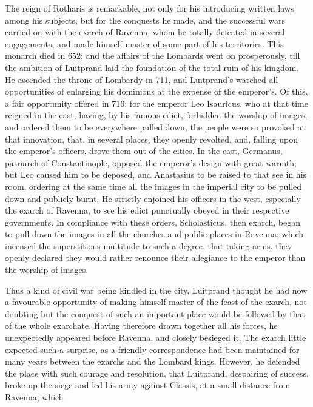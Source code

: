 \documentclass{article}
\begin{document}
The reign of Rotharis is remarkable, not only for his introducing written laws among his subjects, but for the conquests he made, and the successful wars carried on with the exarch of Ravenna, whom he totally defeated in several engagements, and made himself master of some part of his territories. This monarch died in 652; and the affairs of the Lombards went on prosperously, till the ambition of Luitprand laid the foundation of the total ruin of his kingdom. He ascended the throne of Lombardy in 711, and Luitprand's watched all opportunities of enlarging his dominions at the expense of the emperor's. Of this, a fair opportunity offered in 716: for the emperor Leo Isauricus, who at that time reigned in the east, having, by his famous edict, forbidden the worship of images, and ordered them to be everywhere pulled down, the people were so provoked at that innovation, that, in several places, they openly revolted, and, falling upon the emperor's officers, drove them out of the cities. In the east, Germanus, patriarch of Constantinople, opposed the emperor's design with great warmth; but Leo caused him to be deposed, and Anastasius to be raised to that see in his room, ordering at the same time all the images in the imperial city to be pulled down and publicly burnt. He strictly enjoined his officers in the west, especially the exarch of Ravenna, to see his edict punctually obeyed in their respective governments. In compliance with these orders, Scholasticus, then exarch, began to pull down the images in all the churches and public places in Ravenna; which incensed the superstitious multitude to such a degree, that taking arms, they openly declared they would rather renounce their allegiance to the emperor than the worship of images.

Thus a kind of civil war being kindled in the city, Luitprand thought he had now a favourable opportunity of making himself master of the feast of the exarch, not doubting but the conquest of such an important place would be followed by that of the whole exarchate. Having therefore drawn together all his forces, he unexpectedly appeared before Ravenna, and closely besieged it. The exarch little expected such a surprise, as a friendly correspondence had been maintained for many years between the exarchs and the Lombard kings. However, he defended the place with such courage and resolution, that Luitprand, despairing of success, broke up the siege and led his army against Classis, at a small distance from Ravenna, which
\end{document}
